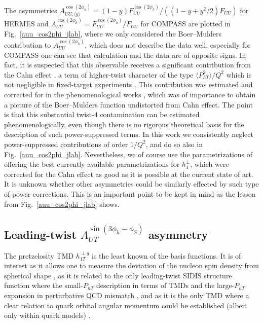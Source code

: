 \documentclass[a4paper,11pt]{article}
\newcommand{\red}[1]{{\color{red} #1}}
\newcommand{\la}{\langle}
\newcommand{\ra}{\rangle}
\newcommand{\AP}[1]{\red{#1}}
\def\Phperp{P_{hT}}
\begin{document}
The asymmetries  $A_{UU, \langle y\rangle}^{\cos(2\phi_h)}=(1-y)F_{UU}^{\cos(2\phi_h)}/((1-y + y^2/2)F_{UU})$
for HERMES \cite{Airapetian:2012yg} and $A_{UU}^{\cos(2\phi_h)}=F_{UU}^{\cos(2\phi_h)}/F_{UU}$ for COMPASS \cite{Adolph:2014pwc}
are plotted in Fig.~\ref{auu_cos2phi_jlab}, where we only considered the
Boer--Mulders contribution to $A_{UU}^{\cos(2\phi_h)}$, which does not describe
the data well, \AP{especially for COMPASS one can see that calculation and the data are of opposite signs}. In fact, it is suspected that this observable receives 
a significant contribution from the Cahn effect \cite{Cahn:1978se}, a 
term of higher-twist character of the type $\la\Phperp^2\ra/Q^2$ which 
is not negligible in fixed-target experiments \cite{Schweitzer:2010tt}. 
This contribution was estimated and corrected for in the phenomenological 
works \cite{Barone:2009hw,Barone:2010gk,Barone:2015ksa}, which was of
importance to obtain a picture of the Boer--Mulders function undistorted 
from Cahn effect. The point is that this substantial twist-4 contamination 
can be estimated phenomenologically, even though there is no rigorous 
theoretical basis for the description of such power-suppressed terms. 
In this work we consistently neglect power-suppressed contributions of 
order $1/Q^2$, and do so also in Fig.~\ref{auu_cos2phi_jlab}. 
Nevertheless, we of course use the parametrizations of 
\cite{Barone:2009hw,Barone:2010gk,Barone:2015ksa} offering
the best currently available parametrizations for $h_1^{\perp}$,
which were corrected for the Cahn effect as good as it is possible at
the current state of art. It is unknown whether other asymmetries
could be similarly effected by such type of power-corrections.
This is an important point to be kept in mind as the lesson 
from Fig.~\ref{auu_cos2phi_jlab} shows.



\subsection{\boldmath Leading-twist $A_{UT}^{\sin(3\phi_h-\phi_S)}$  asymmetry}
\label{Sec-5.6:pretzel-basis}

The pretzelosity TMD $h_{1T}^{\perp q}$ is the least known of the basis 
functions. It is of interest as it allows one to measure the deviation 
of the nucleon spin density from spherical shape \cite{Miller:2007ae},
as it is related to the only leading-twist SIDIS structure function where the 
small-$P_{hT}$ description in terms of TMDs and the large-$P_{hT}$ expansion 
in perturbative QCD mismatch \cite{Bacchetta:2008xw}, and as it is the only
TMD where a clear relation to quark orbital angular momentum
could be established (albeit only within quark models)
\cite{Avakian:2008dz,She:2009jq,Avakian:2010br,Lorce:2011kn}.
\end{document}
